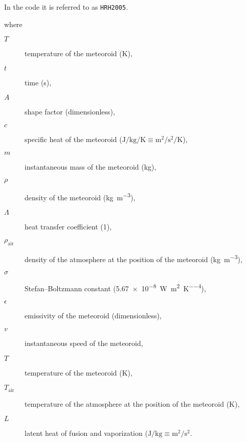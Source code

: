         In the code it is referred to as \texttt{HRH2005}.

        where
        \begin{description}
            \item[$T$]
                temperature of the meteoroid ($\mathrm{K}$),
            \item[$t$]
                time (\si{\second}),
            \item[$A$]
                shape factor (dimensionless),
            \item[$c$]
                specific heat of the meteoroid ($\si{\joule\per\kilo\gram\per\kelvin} \equiv \si{\metre\squared\per\second\squared\per\kelvin}$),
            \item[$m$]
                instantaneous mass of the meteoroid (\si{\kilo\gram}),
            \item[$\rho$]
                density of the meteoroid (\si{\kilo\gram\per\metre\cubed}),
            \item[$\Lambda$]
                heat transfer coefficient (\si{1}),
            \item[$\rho_\mathrm{air}$]
                density of the atmosphere at the position of the meteoroid (\si{\kilo\gram\per\metre\cubed}),
            \item[$\sigma$]
                Stefan--Boltzmann constant (\SI{5.67e-8}{\watt\per\metre\squared\per\kelvin\tothe{4}}),
            \item[$\epsilon$]
                emissivity of the meteoroid (dimensionless),
            \item[$v$]
                instantaneous speed of the meteoroid,
            \item[$T$]
                temperature of the meteoroid (\si{\kelvin}),
            \item[$T_\mathrm{air}$]
                temperature of the atmosphere at the position of the meteoroid (\si{\kelvin}),
            \item[$L$]
                latent heat of fusion and vaporization ($\si{\joule\per\kilo\gram} \equiv \si{\metre\squared\per\second\squared}$.

        \end{description}

